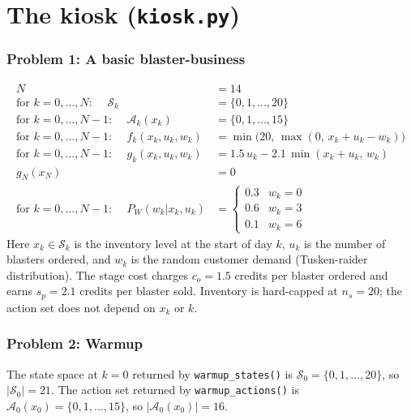 \documentclass[12pt]{article}
\begin{document}

\section{The kiosk (\texttt{kiosk.py})}
\subsubsection*{{\color{red}Problem 1:  A basic blaster-business}}

\begin{align}
	N & = 14 \\
	\mbox{for $k=0,\dots,N$: }\quad	\mathcal{S}_k & = \{0, 1, \ldots, 20\} \\
	\mbox{for $k=0,\dots,N-1$: }\quad \mathcal{A}_k(x_k) & = \{0, 1, \ldots, 15\} \\
    \mbox{for $k=0,\dots,N-1$: }\quad f_k(x_k, u_k, w_k) & = \min\!\bigl(20,\,\max(0,\, x_k + u_k - w_k)\bigr) \\
	\mbox{for $k=0,\dots,N-1$: }\quad g_k(x_k, u_k, w_k) & = 1.5\,u_k - 2.1\,\min(x_k+u_k,\,w_k) \\
	g_N(x_N) & = 0 \\
    \mbox{for $k=0,\dots,N-1$: }\quad P_W(w_k | x_k, u_k) & =
	\begin{cases}
		0.3 & w_k = 0 \\
		0.6 & w_k = 3 \\
		0.1 & w_k = 6
	\end{cases}
\end{align}
Here $x_k \in \mathcal{S}_k$ is the inventory level at the start of day $k$, $u_k$ is the number of blasters ordered, and $w_k$ is the random customer demand (Tusken-raider distribution). The stage cost charges $c_o = 1.5$ credits per blaster ordered and earns $s_p = 2.1$ credits per blaster sold. Inventory is hard-capped at $n_s = 20$; the action set does not depend on $x_k$ or $k$.

\subsubsection*{{\color{red}Problem 2:  Warmup}}

The state space at $k=0$ returned by \texttt{warmup\_states()} is $\mathcal{S}_0 = \{0, 1, \ldots, 20\}$, so $|\mathcal{S}_0| = 21$. The action set returned by \texttt{warmup\_actions()} is $\mathcal{A}_0(x_0) = \{0, 1, \ldots, 15\}$, so $|\mathcal{A}_0(x_0)| = 16$.
\end{document}
